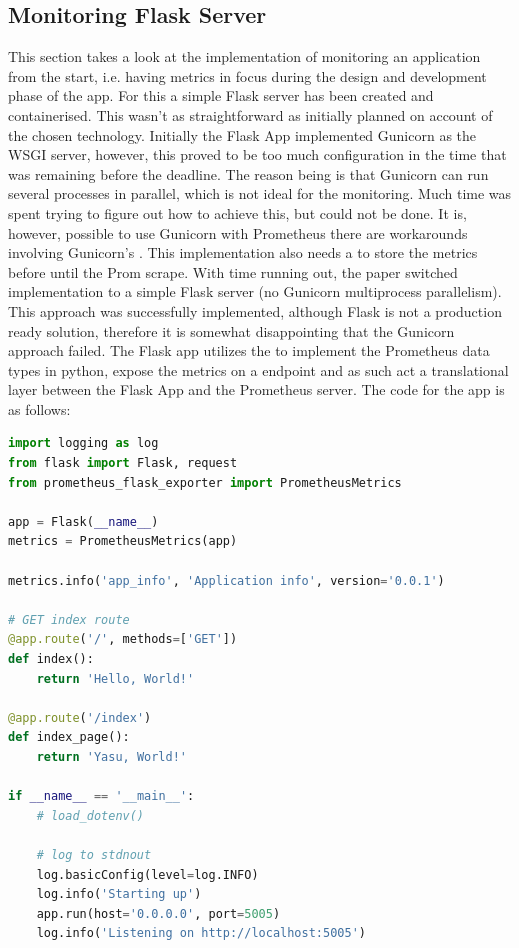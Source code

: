 \subsection{Monitoring Flask Server}
This section takes a look at the implementation of monitoring an application from the start, i.e. having metrics in focus during the design
and development phase of the app. For this a simple Flask server has been created and containerised. This wasn't as straightforward as initially
planned on account of the chosen technology. Initially the Flask App implemented Gunicorn\autocite{GunicornPythonWSGI} as the WSGI server,
however, this proved to be too much configuration in the time that was remaining before the deadline. The reason being is that Gunicorn can run
several processes in parallel, which is not ideal for the monitoring. Much time was spent trying to figure out how to achieve this, but
could not be done. It is, however, possible to use Gunicorn with Prometheus there are workarounds involving Gunicorn's .
This implementation also needs a  to store the metrics before until the Prom scrape. With time running out,
the paper switched implementation to a simple Flask server (no Gunicorn multiprocess parallelism). This approach was successfully implemented,
although Flask is not a production ready solution, therefore it is somewhat disappointing that the Gunicorn approach failed.
\bigbreak
The Flask app utilizes the  to implement the Prometheus data types in python, expose the metrics on a
 endpoint and as such act a translational layer between the Flask App and the Prometheus server. The code for the app is as
follows:\\
\begin{lstlisting}[language=python, label={flask_app}, caption={Flask App for Prometheus monitoring.}]
import logging as log
from flask import Flask, request
from prometheus_flask_exporter import PrometheusMetrics

app = Flask(__name__)
metrics = PrometheusMetrics(app)

metrics.info('app_info', 'Application info', version='0.0.1')

# GET index route
@app.route('/', methods=['GET'])
def index():
	return 'Hello, World!'

@app.route('/index')
def index_page():
	return 'Yasu, World!'

if __name__ == '__main__':
	# load_dotenv()

	# log to stdnout
	log.basicConfig(level=log.INFO)
	log.info('Starting up')
	app.run(host='0.0.0.0', port=5005)
	log.info('Listening on http://localhost:5005')
\end{lstlisting}
